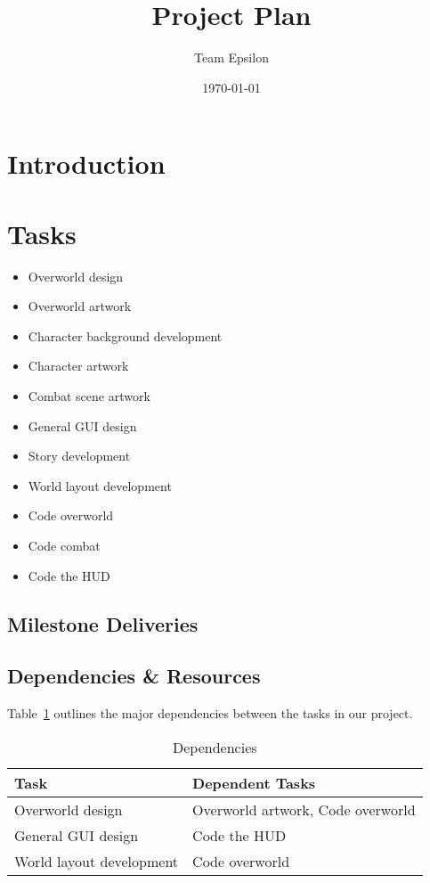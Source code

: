 \documentclass[12pt,titlepage]{article}
\title{Project Plan}
\author{Team Epsilon}
\date{\today}
\begin{document}
\maketitle

\section{Introduction}

\section{Tasks}

\begin{itemize}
    \item Overworld design
    \item Overworld artwork
    \item Character background development
    \item Character artwork
    \item Combat scene artwork
    \item General GUI design
    \item Story development
    \item World layout development
    \item Code overworld
    \item Code combat
    \item Code the HUD
\end{itemize}

\subsection{Milestone Deliveries}

\subsection{Dependencies \& Resources}
Table~\ref{tab:dependencies} outlines the major dependencies between the tasks
in our project.
\begin{table}[H]
    \caption{Dependencies}
    \label{tab:dependencies}
    \centering
    \begin{tabularx}{\linewidth}{|l|X|}
        \hline
        \textbf{Task} & \textbf{Dependent Tasks} \\
        \hline
        Overworld design & Overworld artwork, Code overworld \\
        General GUI design & Code the HUD \\
        World layout development & Code overworld \\
        \hline
    \end{tabularx}
\end{table}
\end{document}
